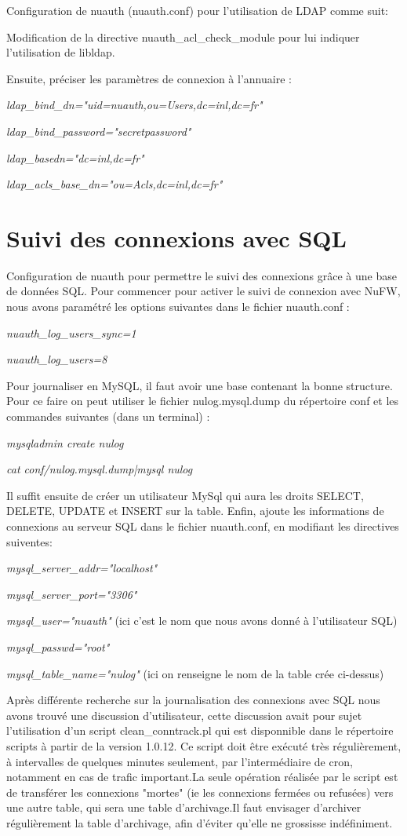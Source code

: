 \documentclass[12pt]{report}
\begin{document}
\begin{itemize}
Configuration de nuauth (nuauth.conf) pour l'utilisation de LDAP comme suit:

Modification de la directive nuauth\_acl\_check\_module pour lui indiquer l'utilisation de libldap.

Ensuite, préciser les paramètres de connexion à l’annuaire :

\textit{ldap\_bind\_dn="uid=nuauth,ou=Users,dc=inl,dc=fr"}

\textit{ldap\_bind\_password="secretpassword"}

\textit{ldap\_basedn="dc=inl,dc=fr"}

\textit{ldap\_acls\_base\_dn="ou=Acls,dc=inl,dc=fr"}

\section{Suivi des connexions avec SQL}
Configuration de nuauth pour permettre le suivi des connexions grâce à une base de données SQL. Pour commencer pour 
activer le suivi de connexion avec NuFW, nous avons paramétré les options suivantes dans le fichier nuauth.conf :

\textit{nuauth\_log\_users\_sync=1}

\textit{nuauth\_log\_users=8}

Pour journaliser en MySQL, il faut avoir une base contenant la bonne structure. Pour ce faire on peut utiliser 
le fichier nulog.mysql.dump du répertoire conf et les commandes suivantes (dans un terminal) :

\textit{mysqladmin create nulog}

\textit{cat conf/nulog.mysql.dump|mysql nulog}

Il suffit ensuite de créer un utilisateur MySql qui aura les droits SELECT, DELETE, UPDATE et INSERT sur la table. Enfin, ajoute 
les informations de connexions au serveur SQL dans le fichier nuauth.conf, en modifiant les directives suiventes:

\textit{mysql\_server\_addr="localhost"}

\textit{mysql\_server\_port="3306"}

\textit{mysql\_user="nuauth"} (ici c'est le nom que nous avons donné à l'utilisateur SQL)

\textit{mysql\_passwd="root"}

\textit{mysql\_table\_name="nulog"} (ici on renseigne le nom de la table crée ci-dessus)

Après différente recherche sur la journalisation des connexions avec SQL nous avons trouvé une discussion d'utilisateur, 
cette discussion avait pour sujet l'utilisation d'un script clean\_conntrack.pl qui est disponnible dans le répertoire scripts 
à partir de la version 1.0.12. 
Ce script doit être exécuté très régulièrement, à intervalles de quelques minutes seulement, par l’intermédiaire de cron, 
notamment en cas de trafic important.La seule opération réalisée par le script est de transférer les connexions "mortes" 
(ie les connexions fermées ou refusées) vers une autre table, qui sera une table d’archivage.Il faut envisager d’archiver 
régulièrement la table d'archivage, afin d’éviter qu’elle ne grossisse indéfiniment.


\end{itemize}
\end{document}
